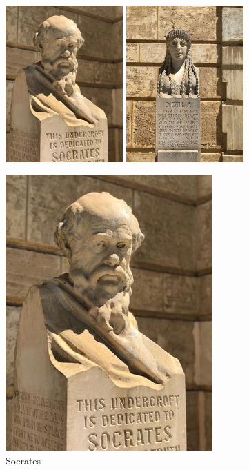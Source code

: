 \documentclass[
  a4paper,
]{article}
\begin{document}
\begin{figure}[h]
  \begin{minipage}[b]{0.5\textwidth}
    \centering
    \includegraphics[height=60mm]{images/socrates-close-up.jpg}
  \end{minipage}\hfill
  \begin{minipage}[b]{0.5\textwidth}
    \centering
    \includegraphics[height=60mm]{images/diotima-2.jpg}
  \end{minipage}
\end{figure}

\begin{figure}
\centering
\includegraphics{images/socrates-close-up.jpg}
\caption{Socrates}
\end{figure}
\end{document}
